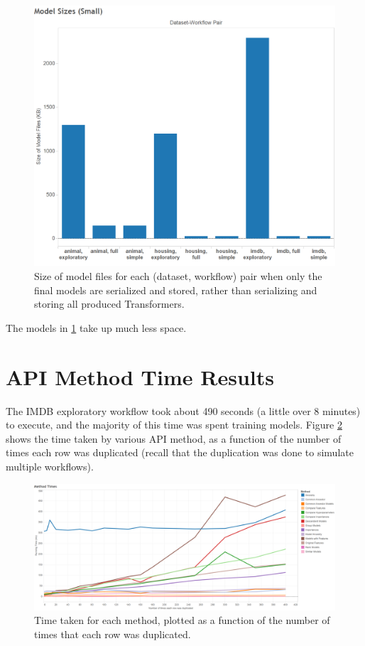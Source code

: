 \begin{figure}
  \centering
  \includegraphics[width=5.0in]{modelsizes_small}
  \caption{
    Size of model files for each (dataset, workflow) pair when only the final models are serialized
    and stored, rather than serializing and storing all produced Transformers.
  }
  \label{fig:modelsizes_small}
\end{figure}

The models in \ref{fig:modelsizes_small} take up much less space.

\section{API Method Time Results}
The IMDB exploratory workflow took about 490 seconds (a little over 8 minutes)
to execute, and the majority of this time was spent training models. Figure \ref{fig:methodtimes}
shows the time taken by various API method, as a function of the number of times each row
was duplicated (recall that the duplication was done to simulate multiple workflows).

\begin{figure}
  \centering
  \includegraphics[width=6.0in]{methodtimes}
  \caption{
    Time taken for each method, plotted as a function of the number of times that
    each row was duplicated.
  }
  \label{fig:methodtimes}
\end{figure}

